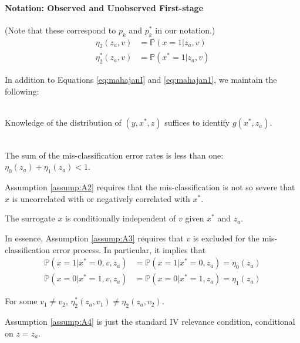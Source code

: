 \documentclass[12pt]{article}
\begin{document}
\paragraph{Notation: Observed and Unobserved First-stage} 
(Note that these correspond to $p_k$ and $p_k^*$ in our notation.)
\begin{align*}
  \eta_2(z_a, v) &= \mathbb{P}(x=1|z_a, v) \\
  \eta_2^*(z_a,v) &= \mathbb{P}(x^*=1|z_a,v)
\end{align*}

In addition to Equations \ref{eq:mahajanI} and \ref{eq:mahajan1}, we maintain the following:
\begin{assump}\mbox{}
     \\ Knowledge of the distribution of $(y,x^*,z)$ suffices to identify $g(x^*,z_a)$.
  \label{assump:A1}
\end{assump}
\begin{assump}\mbox{}
      \\ The sum of the mis-classification error rates is less than one: $\eta_0(z_a) + \eta_1(z_a) < 1$.
  \label{assump:A2}
\end{assump}
Assumption \ref{assump:A2} requires that the mis-classification is not so severe that $x$ is uncorrelated with or negatively correlated with $x^*$.

\begin{assump}
      The surrogate $x$ is conditionally independent of $v$ given $x^*$ and $z_a$.
  \label{assump:A3}
\end{assump}

In essence, Assumption \ref{assump:A3} requires that $v$ is excluded for the mis-classification error process.
In particular, it implies that
\begin{align*}
  \mathbb{P}(x=1|x^*=0,v, z_a) &= \mathbb{P}(x=1|x^*=0,z_a) = \eta_0(z_a)\\
  \mathbb{P}(x=0|x^*=1,v, z_a) &= \mathbb{P}(x=0|x^*=1,z_a) = \eta_1(z_a)
\end{align*}

\begin{assump}\mbox{}
  For some $v_1 \neq v_2$, $\eta^*_2(z_a,v_1) \neq \eta_2(z_a,v_2)$.
  \label{assump:A4}
\end{assump}

Assumption \ref{assump:A4} is just the standard IV relevance condition, conditional on $z = z_a$.
\end{document}
